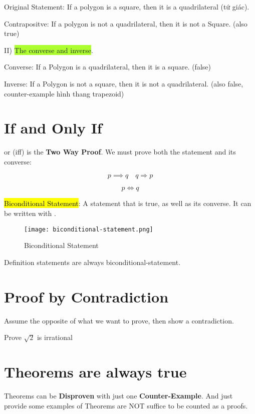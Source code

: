 Original Statement: If a polygon is a square, then it is a quadrilateral (tứ giác).

Contrapositve: If a polygon is not a quadrilateral, then it is not a Square. (also true)

\vspace{.4cm}

II) \colorbox{GreenYellow}{The converse and inverse}.

Converse: If a Polygon is a quadrilateral, then it is a square. (false)

Inverse: If a Polygon is not a square, then it is not a quadrilateral. (also false, counter-example hình thang trapezoid)

\section{If and Only If}

 or (iff) is the \textbf{Two Way Proof}. We must prove both the statement and its converse:

\[p \implies q \quad q \Longrightarrow p\]

\[p \iff q\]

\hl{Biconditional Statement}: A statement that is true, as well as its converse. It can be written with .

\begin{figure}[htb!]
  \centering
  \texttt{[image: biconditional-statement.png]}
  \caption{Biconditional Statement}
\end{figure}

Definition statements are always biconditional-statement.

\section{Proof by Contradiction}

Assume the opposite of what we want to prove, then show a contradiction.

Prove $\sqrt{2}$ is irrational

\section{Theorems are always true}

Theorems can be \textbf{Disproven} with just one \textbf{Counter-Example}. And just provide some examples of Theorems are NOT suffice to be counted as a proofs.

